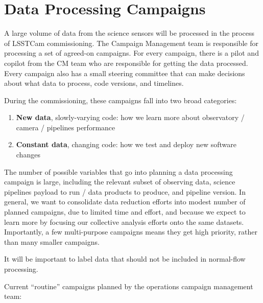 \documentclass[SE,authoryear,toc,lsstdraft]{lsstdoc}
\begin{document}
\section{Data Processing Campaigns}

A large volume of data from the science sensors will be processed in the process of LSSTCam commissioning.
The Campaign Management team is responsible for processing a set of agreed-on campaigns.
For every campaign, there is a pilot and copilot from the CM team who are responsible for getting the data processed.
Every campaign also has a small steering committee that can make decisions about what data to process, code versions, and timelines.

During the commissioning, these campaigns fall into two broad categories:

\begin{enumerate}

  \item \textbf{New data}, slowly-varying code: how we learn more about observatory / camera / pipelines performance

  \item \textbf{Constant data}, changing code: how we test and deploy new software changes

\end{enumerate}

The number of possible variables that go into planning a data processing campaign is large, including the relevant subset of observing data, science pipelines payload to run / data products to produce, and pipeline version.
In general, we want to consolidate data reduction efforts into modest number of planned campaigns, due to limited time and effort, and because we expect to learn more by focusing our collective analysis efforts onto the same datasets.
Importantly, a few multi-purpose campaigns means they get high priority, rather than many smaller campaigns.

It will be important to label data that should not be included in normal-flow processing.

Current ``routine'' campaigns planned by the operations campaign management team:
\end{document}
